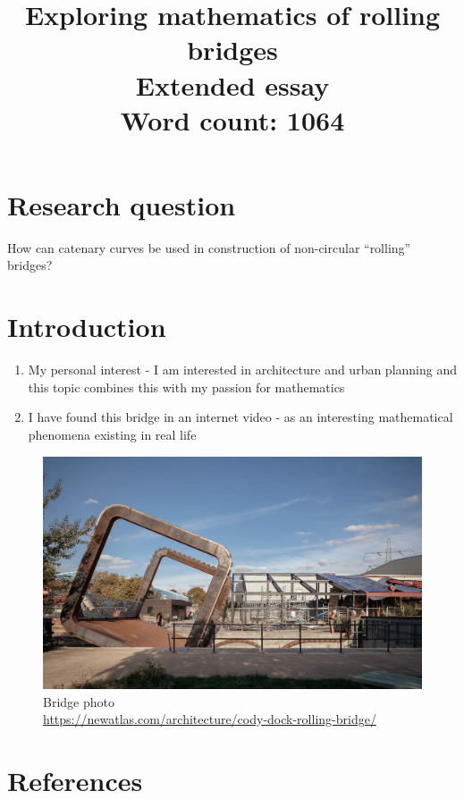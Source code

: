 \documentclass[12pt]{article}
\title{Exploring mathematics of rolling bridges \\
    \large Extended essay \\
    \vspace{12pt} Word count: 1064}
\date{}
\author{}
\begin{document}
    \maketitle
    \newpage
    \tableofcontents
    \newpage
    
    \section{Research question}

    How can catenary curves be used in construction of non-circular ``rolling'' bridges?
    
    \section{Introduction}
    
        \begin{enumerate}
            \item My personal interest - I am interested in architecture and urban planning and this topic combines this with my passion for mathematics
            \item I have found this bridge in an internet video - as an interesting mathematical phenomena existing in real life
        \end{enumerate}

        \begin{figure}[H]
            \centering
            \includegraphics[width=0.75\linewidth]{images/bridge.png}
            \caption{Bridge photo \\\url{https://newatlas.com/architecture/cody-dock-rolling-bridge/}}
            \label{fig:bridge_photo}
        \end{figure}

    \section{References}
\end{document}
